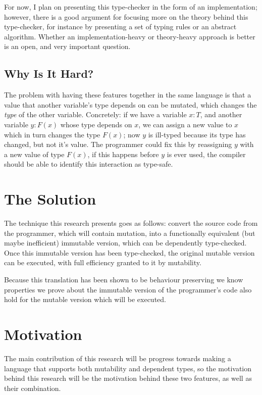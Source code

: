 \documentclass[12pt,twoside]{report}
\begin{document}
For now, I plan on presenting this type-checker in the form of an implementation; however, there is a good argument for focusing more on the theory behind this type-checker, for instance by presenting a set of typing rules or an abstract algorithm. Whether an implementation-heavy or theory-heavy approach is better is an open, and very important question.

\subsection{Why Is It Hard?}
The problem with having these features together in the same language is that a value that another variable's type depends on can be mutated, which changes the \textit{type} of the other variable. Concretely: if we have a variable $x: T$, and another variable $y: F(x)$ whose type depends on $x$, we can assign a new value to $x$ which in turn changes the type $F(x)$; now $y$ is ill-typed because its type has changed, but not it's value. The programmer could fix this by reassigning $y$ with a new value of type $F(x)$, if this happens before $y$ is ever used, the compiler should be able to identify this interaction as type-safe.

\section{The Solution}
\label{thesolution}
The technique this research presents goes as follows: convert the source code from the programmer, which will contain mutation, into a functionally equivalent (but maybe inefficient) immutable version, which can be dependently type-checked. Once this immutable version has been type-checked, the original mutable version can be executed, with full efficiency granted to it by mutability.

Because this translation has been shown to be behaviour preserving\cite{ullrich_electrolysis_nodate} we know properties we prove about the immutable version of the programmer's code also hold for the mutable version which will be executed.

\section{Motivation}
The main contribution of this research will be progress towards making a language that supports both mutability and dependent types, so the motivation behind this research will be the motivation behind these two features, as well as their combination.
\end{document}
